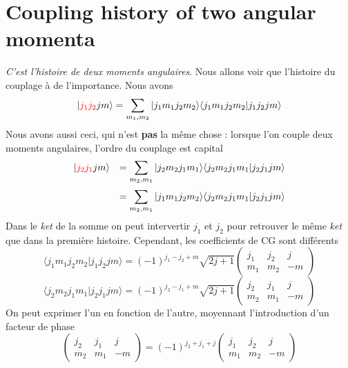 \section{Coupling history of two angular momenta}
\textit{C'est l'histoire de deux moments angulaires}. Nous allons voir que l'histoire du 
couplage à de l'importance. Nous avons
\begin{equation}
\vert{\color{red} j_1 j_2} j m \rangle = 
\sum_{m_1,m_2} \vert j_1 m_1 j_2 m_2 \rangle \langle 
j_1 m_1 j_2 m_2 
\vert j_1 j_2 j m \rangle
\end{equation}
Nous avons aussi ceci, qui n'est \textbf{pas} la même chose : lorsque l'on couple deux moments
angulaires, l'ordre du couplage est capital
\begin{equation}
\begin{array}{ll}
\vert {\color{red} j_2  j_1} j m \rangle &= \DS
\sum_{m_2, m_1} \vert j_2 m_2 j_1 m_1 \rangle \langle 
j_2 m_2 j_1 m_1
\vert j_2 j_1 j m \rangle\vspace{2mm}\\
&=\DS 
\sum_{m_2, m_1} \vert j_1 m_1 j_2 m_2 \rangle \langle 
j_2 m_2 j_1 m_1
\vert j_2 j_1 j m \rangle
\end{array}
\end{equation}
Dans le \textit{ket} de la somme on peut intervertir $j_1$ et $j_2$ pour retrouver
le même \textit{ket} que dans la première histoire. Cependant, les coefficients de 
CG sont différents
\begin{equation}
\langle j_1 m_1 j_2 m_2 \vert j_1 j_2 j m \rangle 
= (-1)^{j_1 - j_2 + m} \sqrt{2j+1} \left(
\begin{array}{ccc}
j_1 & j_2 & j \\
m_1 & m_2 & -m 
\end{array} \right)
\end{equation}
\begin{equation}
\langle j_2 m_2 j_1 m_1 \vert j_2 j_1 j m \rangle 
= (-1)^{j_2 - j_1 + m} \sqrt{2j+1} \left(
\begin{array}{ccc}
j_2 & j_1 & j \\
m_2 & m_1 & -m 
\end{array} \right)
\end{equation}
On peut exprimer l'un en fonction de l'autre, moyennant l'introduction d'un facteur de phase
\begin{equation}
\left( \begin{array}{ccc} j_2 & j_1 & j \\ m_2 & m_1 & -m 
        \end{array} \right)
= (-1)^{j_2 + j_1 +j}
\left( \begin{array}{ccc}
j_1 & j_2 & j \\
m_1 & m_2 & -m 
\end{array} \right)
\end{equation}

